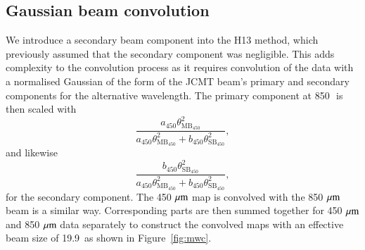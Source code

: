 \subsection{Gaussian beam convolution}
We introduce a secondary beam component into the H13 method, which previously 
assumed that the secondary component was negligible. This adds complexity 
to the convolution process as it requires convolution of the data with a normalised 
Gaussian of the form of the JCMT beam's primary and secondary components for 
the alternative wavelength. The primary component at 850\,\micron\ is then scaled with 
\begin{equation}
\frac{a_{\mathrm{450}}\theta _{\mathrm{MB_{\mathrm{450}}}}^{2}}{a _{\mathrm{450}}\theta _{\mathrm{MB_{\mathrm{450}}}}^{2}+b _{\mathrm{450}}\theta _{\mathrm{SB_{\mathrm{450}}}}^{2}}, \label{eqn:scaleMB}
\end{equation}
and likewise 
\begin{equation}
\frac{b_{\mathrm{450}}\theta _{\mathrm{SB_{\mathrm{450}}}}^{2}}{a_{\mathrm{450}}\theta _{\mathrm{MB_{\mathrm{450}}}}^{2}+b_{\mathrm{450}}\theta _{\mathrm{SB_{\mathrm{450}}}}^{2}}, \label{eqn:scaleSB}
\end{equation} 
for the secondary component. The 450\,$\,\mu\rm{m}$ map is convolved with the 850\,$\,\mu\rm{m}$ 
beam is a similar way. Corresponding parts are then summed together for 450\,$\,\mu\rm{m}$ and 
850\,$\,\mu\rm{m}$ data separately to construct the convolved maps with an effective beam size of 
19.9\arcsec\ as shown in Figure~\ref{fig:mwc}.


